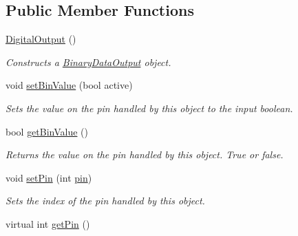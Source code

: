 \subsection*{Public Member Functions}
\begin{DoxyCompactItemize}
\item 
\hyperlink{class_picto_1_1_digital_output_aee766b5ba8f3e317044cfdef56ff3b14}{Digital\-Output} ()
\begin{DoxyCompactList}\small\item\em Constructs a \hyperlink{class_picto_1_1_binary_data_output}{Binary\-Data\-Output} object. \end{DoxyCompactList}\item 
\hypertarget{class_picto_1_1_digital_output_a8708f6d695b01f18357c498290755848}{void \hyperlink{class_picto_1_1_digital_output_a8708f6d695b01f18357c498290755848}{set\-Bin\-Value} (bool active)}\label{class_picto_1_1_digital_output_a8708f6d695b01f18357c498290755848}

\begin{DoxyCompactList}\small\item\em Sets the value on the pin handled by this object to the input boolean. \end{DoxyCompactList}\item 
\hypertarget{class_picto_1_1_digital_output_a850479d8884af72765192471fe4045ac}{bool \hyperlink{class_picto_1_1_digital_output_a850479d8884af72765192471fe4045ac}{get\-Bin\-Value} ()}\label{class_picto_1_1_digital_output_a850479d8884af72765192471fe4045ac}

\begin{DoxyCompactList}\small\item\em Returns the value on the pin handled by this object. True or false. \end{DoxyCompactList}\item 
\hypertarget{class_picto_1_1_digital_output_a8b9ecb78333d14adad90defc5a0bca8f}{void \hyperlink{class_picto_1_1_digital_output_a8b9ecb78333d14adad90defc5a0bca8f}{set\-Pin} (int \hyperlink{class_picto_1_1_digital_output_aeedde6eb50dc034c32c0803cd623e78f}{pin})}\label{class_picto_1_1_digital_output_a8b9ecb78333d14adad90defc5a0bca8f}

\begin{DoxyCompactList}\small\item\em Sets the index of the pin handled by this object. \end{DoxyCompactList}\item 
\hypertarget{class_picto_1_1_digital_output_ac6d32b516efdce133379f26d939e1442}{virtual int \hyperlink{class_picto_1_1_digital_output_ac6d32b516efdce133379f26d939e1442}{get\-Pin} ()}\label{class_picto_1_1_digital_output_ac6d32b516efdce133379f26d939e1442}


\end{DoxyCompactItemize}
